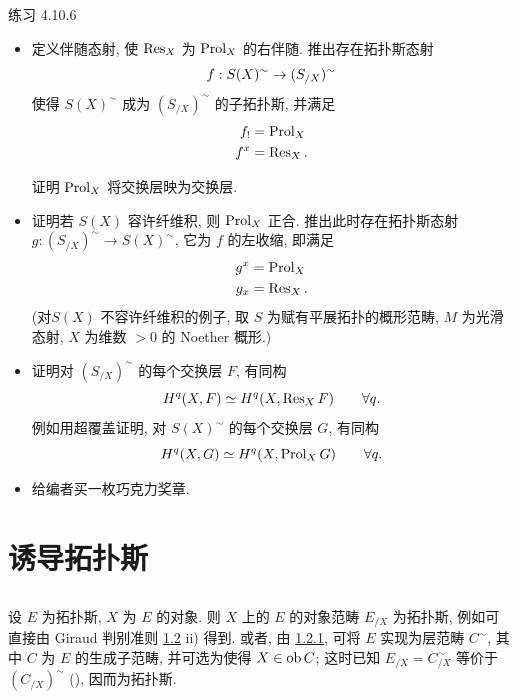 \begin{enonce*}[remark]{练习 4.10.6}
\begin{itemize}
\item[$4^{\circ})$] 定义伴随态射, 使 $\operatorname{Res}_X$ 为 $\operatorname{Prol}_X$ 的右伴随. 推出存在拓扑斯态射
$$
f:S(X)^{\sim}\rightarrow (S_{/X})^{\sim}{}
$$
使得 $S(X)^{\sim}$ 成为 $(S_{/X})^{\sim}$ 的子拓扑斯, 并满足
\begin{align*}
f_{!} &= \operatorname{Prol}_X\\
f^x &= \operatorname{Res}_X{}.
\end{align*}

证明 $\operatorname{Prol}_X$ 将交换层映为交换层.

\item[$5^{\circ})$] 证明若 $S(X)$ 容许纤维积, 则 $\operatorname{Prol}_X$ 正合. 推出此时存在拓扑斯态射 $g:(S_{/X})^{\sim}\rightarrow S(X)^{\sim}$, 它为 $f$ 的左收缩, 即满足
\begin{align*}
g^x &= \operatorname{Prol}_X\\
g_x &= \operatorname{Res}_X{}.
\end{align*}
(对\pageoriginale $S(X)$ 不容许纤维积的例子, 取 $S$ 为赋有平展拓扑的概形范畴, $M$ 为光滑态射, $X$ 为维数 $>0$ 的 Noether 概形.)

\item[$6^{\circ})$] 证明对 $(S_{/X})^{\sim}$ 的每个交换层 $F$, 有同构
$$
H^q(X,F)\simeq H^q(X,\operatorname{Res}_X F)\qquad \forall q{}.
$$
例如用超覆盖证明, 对 $S(X)^{\sim}$ 的每个交换层 $G$, 有同构
$$
H^q(X,G)\simeq H^q(X,\operatorname{Prol}_X G)\qquad \forall q{}.
$$

\item[$7^{\circ})$] 给编者买一枚巧克力奖章.
\end{itemize}
\end{enonce*}



\section{诱导拓扑斯}

\subsection{}
设 $E$ 为拓扑斯, $X$ 为 $E$ 的对象. 则 $X$ 上的 $E$ 的对象范畴 $E_{/X}$ 为拓扑斯, 例如可直接由 Giraud 判别准则 \hyperref[IV.theo1.2]{1.2} ii) 得到. 或者, 由 \hyperref[IV.cor1.2.1]{1.2.1}, 可将 $E$ 实现为层范畴 $C^{\sim}$, 其中 $C$ 为 $E$ 的生成子范畴\pageoriginale, 并可选为使得 $X\in \operatorname{ob} C$; 这时已知 $E_{/X}=C^{\sim}_{/X}$ 等价于 $(C_{/X})^{\sim}$ (), 因而为拓扑斯.

